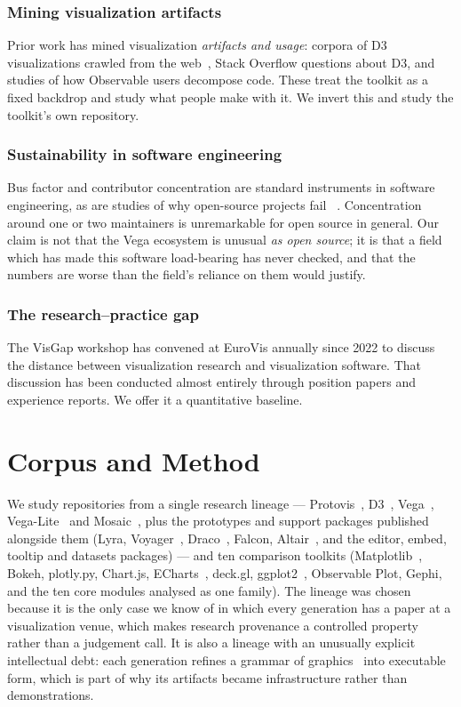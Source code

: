 \documentclass[9pt,twocolumn,letterpaper]{article}
\begin{document}
\subsubsection{Mining visualization artifacts}
Prior work has mined visualization \emph{artifacts and usage}: corpora of D3
visualizations crawled from the web~\cite{hoque2020searching}, Stack Overflow
questions about D3, and studies of how Observable users decompose code. These
treat the toolkit as a fixed backdrop and study what people make with it. We
invert this and study the toolkit's own repository.

\subsubsection{Sustainability in software engineering}
Bus factor and contributor concentration are standard instruments in software
engineering, as are studies of why open-source projects fail~%
\cite{coelho2017fail,avelino2016truck,hassan2008road}. Concentration around one
or two maintainers is unremarkable for open source in general. Our claim is not
that the Vega ecosystem is unusual \emph{as open source}; it is that a field
which has made this software load-bearing has never checked, and that the
numbers are worse than the field's reliance on them would justify.

\subsubsection{The research--practice gap}
The VisGap workshop has convened at EuroVis annually since 2022 to discuss the
distance between visualization research and visualization software. That
discussion has been conducted almost entirely through position papers and
experience reports. We offer it a quantitative baseline.

\section{Corpus and Method}

We study \ecorepos{} repositories from a single research lineage ---
Protovis~\cite{bostock2009protovis}, D3~\cite{bostock2011d3},
Vega~\cite{satyanarayan2016reactivevega},
Vega-Lite~\cite{satyanarayan2017vegalite} and Mosaic~\cite{heer2024mosaic},
plus the prototypes and support packages published alongside them
(Lyra, Voyager~\cite{wongsuphasawat2016voyager}, Draco~\cite{moritz2019draco},
Falcon, Altair~\cite{vanderplas2018altair}, and the editor, embed, tooltip and
datasets packages) --- and ten comparison toolkits
(Matplotlib~\cite{hunter2007matplotlib}, Bokeh, plotly.py, Chart.js,
ECharts~\cite{li2018echarts}, deck.gl, ggplot2~\cite{wickham2010layered},
Observable Plot, Gephi, and the ten  core modules analysed as one
family). The lineage was chosen because it is the only case we know of in which
every generation has a paper at a visualization venue, which makes research
provenance a controlled property rather than a judgement call. It is also a
lineage with an unusually explicit intellectual debt: each generation refines a
grammar of graphics~\cite{wilkinson2005grammar} into executable form, which is
part of why its artifacts became infrastructure rather than demonstrations.
\end{document}

